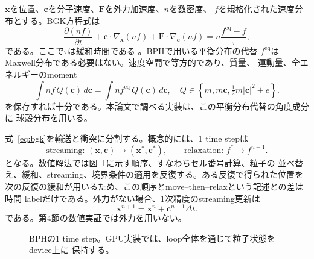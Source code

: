 \documentclass[a4paper,11pt]{ltjsarticle}
\newcommand{\vect}[1]{\bm{#1}}
\begin{document}
$\vect{x}$を位置、$\vect{c}$を分子速度、$\vect{F}$を外力加速度、$n$を数密度、
$f$を規格化された速度分布とする。BGK方程式は
\begin{equation}
 \frac{\partial(nf)}{\partial t}
 + \vect{c}\cdot\nabla_{\vect{x}}(nf)
 + \vect{F}\cdot\nabla_{\vect{c}}(nf)
 = n\frac{f^{\mathrm{eq}}-f}{\tau},
 \label{eq:bgk}
\end{equation}
である。ここで$\tau$は緩和時間である \cite{bgk}。BPHで用いる平衡分布の代替
$f^{\mathrm{eq}}$はMaxwell分布である必要はない。速度空間で等方的であり、質量、
運動量、全エネルギーのmoment
\begin{equation}
 \int nf\,Q(\vect{c})\,d\vect{c}
 =\int nf^{\mathrm{eq}}\,Q(\vect{c})\,d\vect{c},
 \quad
 Q\in\left\{m,m\vect{c},\tfrac12m|\vect{c}|^2+e\right\}.
 \label{eq:moments}
\end{equation}
を保存すれば十分である。本論文で調べる実装は、この平衡分布代替の角度成分に
球殻分布を用いる。

式~\eqref{eq:bgk}を輸送と衝突に分割する。概念的には、1 time stepは
\begin{equation}
 \text{streaming: }(\vect{x},\vect{c})\longrightarrow
 (\vect{x}^{*},\vect{c}^{*}),
 \qquad
 \text{relaxation: }f^{*}\longrightarrow f^{n+1}.
\end{equation}
となる。数値解法では図~\ref{fig:loop}に示す順序、すなわちセル番号計算、粒子の
並べ替え、緩和、streaming、境界条件の適用を反復する。ある反復で得られた位置を
次の反復の緩和が用いるため、この順序とmove--then--relaxという記述との差は時間
labelだけである。外力がない場合、1次精度のstreaming更新は
\begin{equation}
 \vect{x}^{n+1}=\vect{x}^{n}+\vect{c}^{n+1}\Delta t.
 \label{eq:stream}
\end{equation}
である。第4節の数値実証では外力を用いない。

\begin{figure}[H]
 \centering
 \caption{BPHの1 time step。GPU実装では、loop全体を通じて粒子状態をdevice上に
 保持する。}
 \label{fig:loop}
\end{figure}
\end{document}
